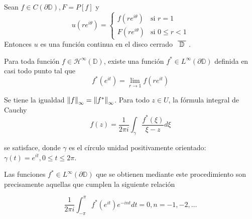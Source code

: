 \begin{theorem}
    \label{fatouaux2}
    Sean $f \in C (\partial \mathbb{D}), F=P[f]$ y
    \begin{equation*}
        u(re^{i \theta}) =
        \begin{cases}
            f(re^{i\theta}) & \text{si } r=1\\ F(re^{i\theta}) & \text{si } 0 \leq r<1
        \end{cases}
    \end{equation*}
    Entonces $u$ es una función continua en el disco cerrado $\xbar{\mathbb{D}}$.
\end{theorem}

\begin{theorem}
    Para toda función $f \in \mathcal{H}^\infty(\mathbb{D})$, existe una función $f^* \in L^{\infty} (\partial \mathbb{D})$ definida en casi todo punto tal que
    \begin{equation}
        \label{fatou1}
        f^*(e^{it}) = \lim_{r \rightarrow 1} f(re^{it})
    \end{equation}

    Se tiene la igualdad $\left\lVert f\right\rVert_{\infty} = \left\lVert f^*\right\rVert_{\infty}$. Para todo $z \in U$, la fórmula integral de Cauchy
    \begin{equation}
        \label{fatou2}
        f(z) = \dfrac{1}{2 \pi i} \int_{\gamma} \dfrac{f^*(\xi)}{\xi - z} d\xi
    \end{equation}

    se satisface, donde $\gamma$ es el círculo unidad positivamente orientado: $\gamma(t) = e^{it}, 0 \leq t \leq 2 \pi$.

    Las funciones $f^* \in L^{\infty}(\partial \mathbb{D})$ que se obtienen mediante este procedimiento son precisamente aquellas que cumplen la siguiente relación

    \begin{equation}
        \label{fatou3}
        \dfrac{1}{2 \pi i} \int_{-\pi}^{\pi} f^*(e^{it})e^{-int} dt = 0, n = -1,-2, \dots
    \end{equation}
\end{theorem}

